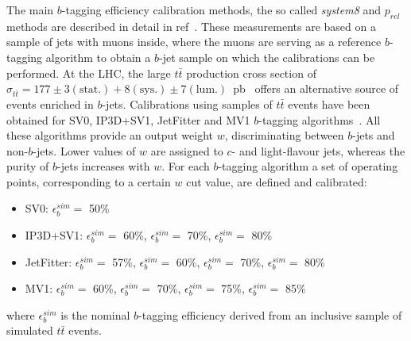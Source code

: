 The main $b$-tagging efficiency calibration methods, the so called \emph{system8} and $p_{rel}$ methods are described in detail in ref~\cite{ATLAS-CONF-2011-089}.%
These measurements are based on a sample of jets with muons inside, where the muons are serving as a reference $b$-tagging algorithm to obtain a $b$-jet sample on which the calibrations can be performed. 
At the LHC, the large $t\bar{t}$ production cross section of $\sigma_{t\bar{t}} = 177 ± 3(\mbox{stat.})+8 (\mbox{sys.}) ± 7(\mbox{lum.})$~pb~\cite{ATLAS-CONF-2012-024} offers an alternative source of events enriched in $b$-jets. %
Calibrations using samples of $t\bar{t}$ events have been obtained for SV0, IP3D+SV1, JetFitter and MV1 $b$-tagging algorithms~\cite{ATLAS-CONF-2012-097}. All these algorithms provide an output weight $w$, discriminating between $b$-jets and non-$b$-jets. Lower values of $w$ are assigned to $c$- and light-flavour jets, whereas the purity of $b$-jets increases with $w$. For each $b$-tagging algorithm a set of operating points, corresponding to a certain $w$ cut value, are defined and calibrated:

\begin{itemize}
\item
SV0: $\epsilon_b^{sim} =$ 50\%
\item
IP3D+SV1: $\epsilon_b^{sim} =$ 60\%, $\epsilon_b^{sim} =$ 70\%, $\epsilon_b^{sim} =$ 80\%
\item
JetFitter: $\epsilon_b^{sim} =$ 57\%, $\epsilon_b^{sim} =$ 60\%,  $\epsilon_b^{sim} =$ 70\%, $\epsilon_b^{sim} =$ 80\%
\item
MV1: $\epsilon_b^{sim} =$ 60\%, $\epsilon_b^{sim} =$ 70\%, $\epsilon_b^{sim} =$ 75\%, $\epsilon_b^{sim} =$ 85\%
\end{itemize}
%
where  $\epsilon_b^{sim}$ is the nominal $b$-tagging efficiency derived from an inclusive sample of simulated $t\bar{t}$ events.

